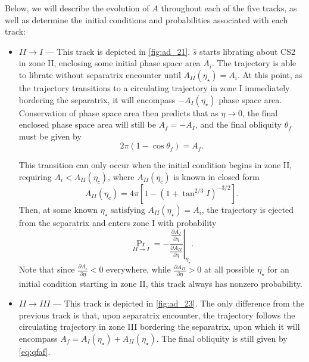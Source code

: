 \documentclass[
        fleqn,
        usenatbib,
    ]{mnras}
\newcommand*{\pd}[2]{\frac{\partial#1}{\partial#2}}
\newcommand*{\at}[1]{\left.#1\right|}
\newcommand*{\p}[1]{\left(#1\right)}
\newcommand*{\s}[1]{\left[#1\right]}
\begin{document}
Below, we will describe the evolution of $A$ throughout each of the five tracks,
as well as determine the initial conditions and probabilities associated with
each track:
\begin{itemize}
    \item $II \to I$ --- This track is depicted in \autoref{fig:ad_21}.
        $\hat{s}$ starts librating about CS2 in zone II, enclosing some initial
        phase space area $A_i$. The trajectory is able to librate without
        separatrix encounter until $A_{II}(\eta_\star) = A_i$. At this point, as
        the trajectory transitions to a circulating trajectory in zone I
        immediately bordering the separatrix, it will encompass
        $-A_I(\eta_\star)$ phase space area. Conservation of phase space area
        then predicts that as $\eta \to 0$, the final enclosed phase space area
        will still be $A_f = -A_I$, and the final obliquity $\theta_f$ must be
        given by
        \begin{equation}
            2\pi\p{1 - \cos \theta_f} = A_f. \label{eq:qfaf}
        \end{equation}

        This transition can only occur when the initial condition begins in zone
        II, requiring $A_i < A_{II}(\eta_c)$, where $A_{II}(\eta_c)$ is known in
        closed form \citep{ward2004I}
        \begin{equation}
            A_{II}\p{\eta_c} = 4\pi \s{
                1 - \p{1 + \tan^{2/3}I}^{-3/2}}.
        \end{equation}
        Then, at some known $\eta_\star$ satisfying $A_{II}(\eta_\star) = A_i$,
        the trajectory is ejected from the separatrix and enters zone I with
        probability
        \begin{equation}
            \Pr_{II \to I} = -\at{\frac{\pd{A_I}{\eta}}{\pd{A_{II}}{\eta}}}
                _{\eta_\star}.
        \end{equation}
        Note that since $\pd{A_i}{\eta} < 0$ everywhere, while
        $\pd{A_{II}}{\eta} > 0$ at all possible $\eta_\star$ for an initial
        condition starting in zone II, this track always has nonzero
        probability.

    \item $II \to III$ --- This track is depicted in \autoref{fig:ad_23}. The
        only difference from the previous track is that, upon separatrix
        encounter, the trajectory follows the circulating trajectory in zone III
        bordering the separatrix, upon which it will encompass $A_f =
        A_I(\eta_\star) + A_{II}(\eta_\star)$. The final obliquity is still
        given by \autoref{eq:qfaf}.


\end{itemize}
\end{document}
